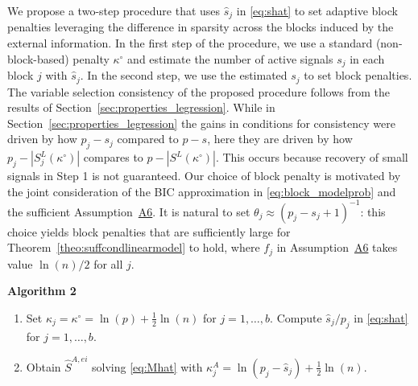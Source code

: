 \documentclass[
  12pt]{article}
\begin{document}
We propose a two-step procedure that uses $\hat{s}_j$ in \eqref{eq:shat} to set adaptive block penalties leveraging the difference in sparsity across the blocks induced by the external information. In the first step of the procedure, we use a standard (non-block-based) penalty $\kappa^{\circ}$ and estimate the number of active signals $s_j$ in each block $j$ with $\hat{s}_j$. In the second step, we use the estimated $s_j$ to set block penalties. The variable selection consistency of the proposed procedure follows from the results of Section~\ref{sec:properties_legression}. While in Section~\ref{sec:properties_legression} the gains in conditions for consistency were driven by how $p_j-s_j$ compared to $p-s$, here they are driven by how $p_j-|S^L_j (\kappa^{\circ})|$ compares to $p-|S^L (\kappa^{\circ})|$. This occurs because recovery of small signals in Step 1 is not guaranteed.
Our choice of block penalty is motivated by the joint consideration of the BIC approximation in \eqref{eq:block_modelprob} and the sufficient Assumption~\hyperlink{lab:A6}{A6}. It is natural to set $\theta_j\approx (p_j-s_j+1)^{-1}$: this choice yields block penalties that are sufficiently large for Theorem~\ref{theo:suffcondlinearmodel} to hold, where $f_j$ in Assumption~\hyperlink{lab:A6}{A6} takes value $\ln(n)/2$ for all $j$.

\textbf{\hypertarget{lab:Algo2}{Algorithm 2}}
\begin{enumerate}[label=(\roman*)]
    \item Set $\kappa_j=\kappa^{\circ}=\ln(p)+\frac{1}{2}\ln(n)$ 
    for $j=1,\ldots,b$. Compute $\hat{s}_j/p_j$ in \eqref{eq:shat} for $j=1,\ldots,b$.
    \item Obtain $\hat{S}^{A,ei}$ solving \eqref{eq:Mhat} with
    $\kappa_j^{A} = \ln(p_j-\hat{s}_j)+ \tfrac{1}{2}\ln(n)$.
\end{enumerate}
\end{document}

